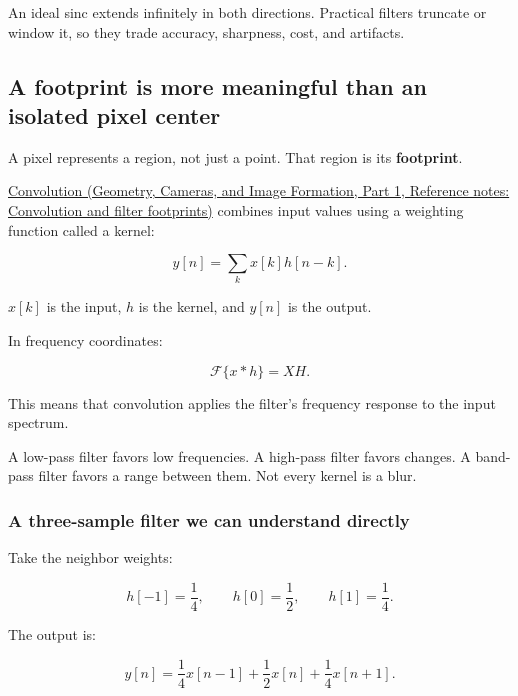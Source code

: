 An ideal sinc extends infinitely in both directions. Practical filters truncate or window it, so they trade accuracy, sharpness, cost, and artifacts.

\subsection{A footprint is more meaningful than an isolated pixel center}\label{04-visual-computing-ii-ch043-a-footprint-is-more-meaningful-than-an-isolated-pixel-center}

\hypertarget{04-visual-computing-ii-ch043-a-footprint-is-more-meaningful-than-an-isolated-pixel-center}{}

A pixel represents a region, not just a point. That region is its \textbf{footprint}.

\href{../03-Geometry-Cameras-and-Image-Formation-P01/main.pdf\#nameddest=appendix-d5b3c692d9f0}{Convolution (Geometry, Cameras, and Image Formation, Part 1, Reference notes: Convolution and filter footprints)} combines input values using a weighting function called a kernel:

\[
y[n]=\sum_k x[k]h[n-k].
\]

\(x[k]\) is the input, \(h\) is the kernel, and \(y[n]\) is the output.

In frequency coordinates:

\[
\mathcal F\{x*h\}=XH.
\]

This means that convolution applies the filter's frequency response to the input spectrum.

A low-pass filter favors low frequencies. A high-pass filter favors changes. A band-pass filter favors a range between them. Not every kernel is a blur.

\subsubsection{A three-sample filter we can understand directly}\label{04-visual-computing-ii-ch043-a-three-sample-filter-we-can-understand-directly}

\hypertarget{04-visual-computing-ii-ch043-a-three-sample-filter-we-can-understand-directly}{}

Take the neighbor weights:

\[
h[-1]=\frac14,\qquad h[0]=\frac12,\qquad h[1]=\frac14.
\]

The output is:

\[
y[n]=\frac14x[n-1]+\frac12x[n]+\frac14x[n+1].
\]

